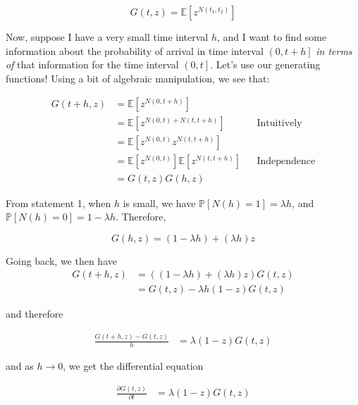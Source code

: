 \documentclass{article}
\begin{document}
\begin{equation}
G(t, z) = \mathbb{E}[z^{N(t_1, t_2)}]
\end{equation}


Now, suppose I have a very small time interval $h$, and I want to find some information about the probability of arrival in time interval $\left(0, t+h\right]$ \textit{in terms of} that information for the time interval $\left(0, t\right]$. Let's use our generating functions! Using a bit of algebraic manipulation, we see that:


\begin{align*}
G(t+h,z) &= \mathbb{E}[z^{N(0, t+h)}] \\
&= \mathbb{E}[z^{N(0, t) + N(t, t+h)}] && \text{Intuitively} \\
&= \mathbb{E}[z^{N(0, t)} z^{N(t, t+h)}] \\
&= \mathbb{E}[z^{N(0, t)}]  \mathbb{E}[z^{N(t, t+h)}] && \text{Independence} \\
&= G(t,z) G(h,z)
\end{align*}


From statement 1, when $h$ is small, we have $\mathbb{P}[N(h) = 1] = \lambda h$, and $\mathbb{P}[N(h) = 0] = 1 - \lambda h$. Therefore, 

\begin{equation}
G(h,z) = (1 - \lambda h) + (\lambda h)z
\end{equation}

Going back, we then have 
\begin{align*}
G(t+h,z) &= ((1 - \lambda h) + (\lambda h)z) G(t,z) \\
&= G(t,z) - \lambda h(1-z) G(t,z)
\end{align*}

and therefore

\begin{align*}
\frac{G(t+h,z) - G(t,z)}{h} &= \lambda (1-z) G(t,z)
\end{align*}

and as $h \rightarrow 0$, we get the differential equation 

\begin{align*}
\frac{\partial G(t,z)}{\partial t} &= \lambda (1-z) G(t,z)
\end{align*}

\end{document}
